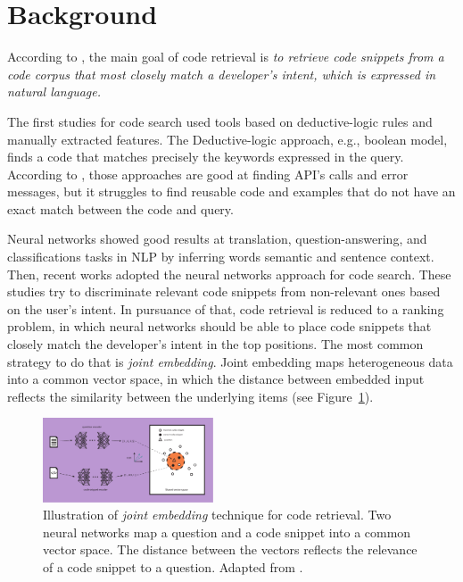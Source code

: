 \documentclass[sigconf]{acmart}
\begin{document}
\section{Background}

According to \citet{cambronero-deep-code-search-2019}, the main goal of code retrieval is \emph{to retrieve code snippets from a code corpus that most closely match a developer's intent, which is expressed in natural language.}

The first studies for code search used tools based on deductive-logic rules and manually extracted features. The Deductive-logic approach, e.g., boolean model, finds a code that matches precisely the keywords expressed in the query. According to \citet{yan-benchmark-code-search-information-retrieval-deep-learning:2020}, those approaches are good at finding API's calls and error messages, but it struggles to find reusable code and examples that do not have an exact match between the code and query. 

Neural networks showed good results at translation, question-answering, and classifications tasks in NLP by inferring words semantic and sentence context. Then, recent works adopted the neural networks approach for code search. These studies try to discriminate relevant code snippets from non-relevant ones based on the user's intent. In pursuance of that, code retrieval is reduced to a ranking problem, in which neural networks should be able to place code snippets that closely match the developer's intent in the top positions. The most common strategy to do that is \emph{joint embedding}. Joint embedding maps heterogeneous data into a common vector space, in which the distance between embedded input reflects the similarity between the underlying items \cite{li-joint-embedding-images-2015} (see Figure~\ref{fig:joint-embedding}).

\begin{figure}[h]
  \includegraphics[width=0.45\textwidth]{figuras/joint_embedding-article.pdf}
  \caption{Illustration of \emph{joint embedding} technique for code retrieval. Two neural networks map a question and a code snippet into a common vector space. The distance between the vectors reflects the relevance of a code snippet to a question. Adapted from \cite{cambronero-deep-code-search-2019}.}
  \label{fig:joint-embedding}
\end{figure}
\end{document}
